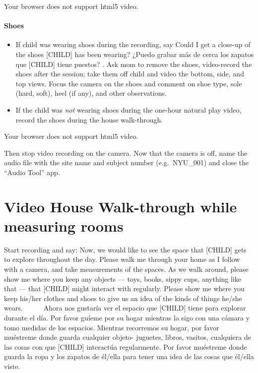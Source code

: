 \documentclass[
  12pt,
]{book}
\providecommand{\tightlist}{%
  \setlength{\itemsep}{0pt}\setlength{\parskip}{0pt}}
\begin{document}
Your browser does not support html5 video.

\hypertarget{shoes}{%
\paragraph{Shoes}\label{shoes}}

\begin{itemize}
\tightlist
\item
  If child was wearing shoes during the recording, say Could I get a close-up of the shoes {[}CHILD{]} has been wearing? ¿Puedo grabar más de cerca los zapatos que {[}CHILD{]} tiene puestos? . Ask mom to remove the shoes, video-record the shoes after the session; take them off child and video the bottom, side, and top views. Focus the camera on the shoes and comment on shoe type, sole (hard, soft), heel (if any), and other observations.
\item
  If the child was \emph{not} wearing shoes during the one-hour natural play video, record the shoes during the house walk-through.
\end{itemize}

Your browser does not support html5 video.

Then stop video recording on the camera. Now that the camera is off, name the audio file with the site name and subject number (e.g.~NYU\_001) and close the ``Audio Tool'' app.

\hypertarget{video-house-walk-through-while-measuring-rooms}{%
\section{Video House Walk-through while measuring rooms}\label{video-house-walk-through-while-measuring-rooms}}

Start recording and say: Now, we would like to see the space that {[}CHILD{]} gets to explore throughout the day. Please walk me through your home as I follow with a camera, and take measurements of the spaces. As we walk around, please show me where you keep any objects --- toys, books, sippy cups, anything like that --- that {[}CHILD{]} might interact with regularly. Please show me where you keep his/her clothes and shoes to give us an idea of the kinds of things he/she wears.
    Ahora nos gustaría ver el espacio que {[}CHILD{]} tiene para explorar durante el día. Por favor guíeme por su hogar mientras la sigo con una cámara y tomo medidas de los espacios. Mientras recorremos su hogar, por favor muéstreme donde guarda cualquier objeto- juguetes, libros, vasitos, cualquiera de las cosas con que {[}CHILD{]} interactúa regularmente. Por favor muéstreme donde guarda la ropa y los zapatos de él/ella para tener una idea de las cosas que él/ella viste.
\end{document}
